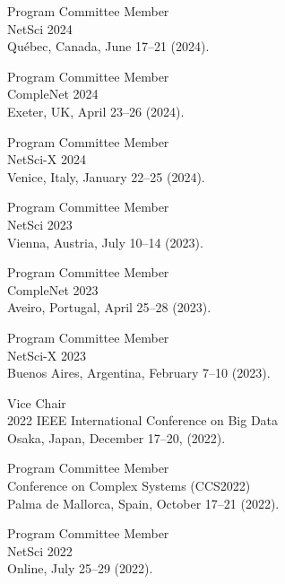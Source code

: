 \documentclass[11pt,letter]{article}
\renewenvironment{itemize}{
  \begin{list}{}{
    \setlength{\leftmargin}{1.5em}
    \setlength{\itemsep}{0.25em}
    \setlength{\parskip}{0pt}
    \setlength{\parsep}{0.25em}
  }
}{
  \end{list}
}
\begin{document}
\begin{itemize}

\item Program Committee Member\\
NetSci 2024\\
Qu\'{e}bec, Canada, June 17--21 (2024).

\item Program Committee Member\\
CompleNet 2024\\
Exeter, UK, April 23--26 (2024).

\item Program Committee Member\\
NetSci-X 2024\\
Venice, Italy, January 22--25 (2024).

\item Program Committee Member\\
NetSci 2023\\
Vienna, Austria, July 10--14 (2023).

\item Program Committee Member\\
CompleNet 2023\\
Aveiro, Portugal, April 25--28 (2023).

\item Program Committee Member\\
NetSci-X 2023\\
Buenos Aires, Argentina, February 7--10 (2023).

\item Vice Chair\\
2022 IEEE International Conference on Big Data\\
Osaka, Japan, December 17--20, (2022).

\item Program Committee Member\\
Conference on Complex Systems (CCS2022)\\
Palma de Mallorca, Spain, October 17--21 (2022).

\item Program Committee Member\\
NetSci 2022\\
Online, July 25--29 (2022).


\end{itemize}
\end{document}
